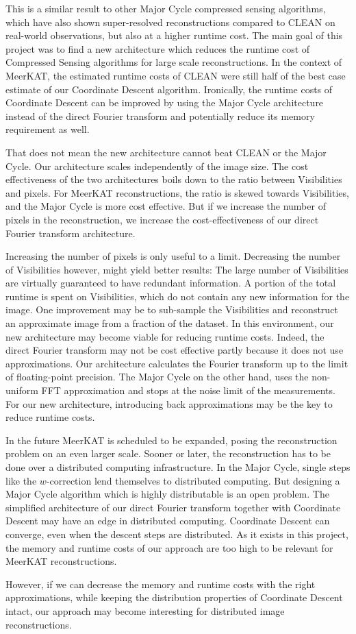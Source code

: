 This is a similar result to other Major Cycle compressed sensing algorithms, which have also shown super-resolved reconstructions compared to CLEAN on real-world observations\cite{dabbech2018cygnus}\cite{girard2015sparse}, but also at a higher runtime cost. The main goal of this project was to find a new architecture which reduces the runtime cost of Compressed Sensing algorithms for large scale reconstructions. In the context of MeerKAT, the estimated runtime costs of CLEAN were still half of the best case estimate of our Coordinate Descent algorithm. Ironically, the runtime costs of Coordinate Descent can be improved by using the Major Cycle architecture instead of the direct Fourier transform and potentially reduce its memory requirement as well.

That does not mean the new architecture cannot beat CLEAN or the Major Cycle. Our architecture scales independently of the image size. The cost effectiveness of the two architectures boils down to the ratio between Visibilities and pixels. For MeerKAT reconstructions, the ratio is skewed towards Visibilities, and the Major Cycle is more cost effective. But if we increase the number of pixels in the reconstruction, we increase the cost-effectiveness of our direct Fourier transform architecture.

Increasing the number of pixels is only useful to a limit. Decreasing the number of Visibilities however, might yield better results: The large number of Visibilities are virtually guaranteed to have redundant information. A portion of the total runtime is spent on Visibilities, which do not contain any new information for the image. One improvement may be to sub-sample the Visibilities and reconstruct an approximate image from a fraction of the dataset. In this environment, our new architecture may become viable for reducing runtime costs. Indeed, the direct Fourier transform may not be cost effective partly because it does not use approximations. Our architecture calculates the Fourier transform up to the limit of floating-point precision. The Major Cycle on the other hand, uses the non-uniform FFT approximation and stops at the noise limit of the measurements. For our new architecture, introducing back approximations may be the key to reduce runtime costs.

In the future MeerKAT is scheduled to be expanded, posing the reconstruction problem on an even larger scale. Sooner or later, the reconstruction has to be done over a distributed computing infrastructure. In the Major Cycle, single steps like the $w$-correction lend themselves to distributed computing. But designing a Major Cycle algorithm which is highly distributable is an open problem. The simplified architecture of our direct Fourier transform together with Coordinate Descent may have an edge in distributed computing. Coordinate Descent can converge, even when the descent steps are distributed. As it exists in this project, the memory and runtime costs of our approach are too high to be relevant for MeerKAT reconstructions. 

However, if we can decrease the memory and runtime costs with the right approximations, while keeping the distribution properties of Coordinate Descent intact, our approach may become interesting for distributed image reconstructions.








 
